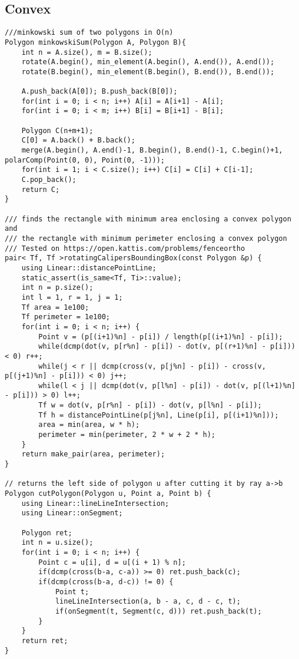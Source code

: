 \documentclass[FSZ,a4paper,onesided]{article}
\begin{document}
\begin{multicols*}{\COLS}
\subsection{Convex}
\begin{lstlisting}
///minkowski sum of two polygons in O(n)
Polygon minkowskiSum(Polygon A, Polygon B){
    int n = A.size(), m = B.size();
    rotate(A.begin(), min_element(A.begin(), A.end()), A.end());
    rotate(B.begin(), min_element(B.begin(), B.end()), B.end());

    A.push_back(A[0]); B.push_back(B[0]);
    for(int i = 0; i < n; i++) A[i] = A[i+1] - A[i];
    for(int i = 0; i < m; i++) B[i] = B[i+1] - B[i];

    Polygon C(n+m+1);
    C[0] = A.back() + B.back();
    merge(A.begin(), A.end()-1, B.begin(), B.end()-1, C.begin()+1, polarComp(Point(0, 0), Point(0, -1)));
    for(int i = 1; i < C.size(); i++) C[i] = C[i] + C[i-1];
    C.pop_back();
    return C;
}

/// finds the rectangle with minimum area enclosing a convex polygon and
/// the rectangle with minimum perimeter enclosing a convex polygon
/// Tested on https://open.kattis.com/problems/fenceortho
pair< Tf, Tf >rotatingCalipersBoundingBox(const Polygon &p) {
    using Linear::distancePointLine;
    static_assert(is_same<Tf, Ti>::value);
    int n = p.size();
    int l = 1, r = 1, j = 1;
    Tf area = 1e100;
    Tf perimeter = 1e100;
    for(int i = 0; i < n; i++) {
        Point v = (p[(i+1)%n] - p[i]) / length(p[(i+1)%n] - p[i]);
        while(dcmp(dot(v, p[r%n] - p[i]) - dot(v, p[(r+1)%n] - p[i])) < 0) r++;
        while(j < r || dcmp(cross(v, p[j%n] - p[i]) - cross(v, p[(j+1)%n] - p[i])) < 0) j++;
        while(l < j || dcmp(dot(v, p[l%n] - p[i]) - dot(v, p[(l+1)%n] - p[i])) > 0) l++;
        Tf w = dot(v, p[r%n] - p[i]) - dot(v, p[l%n] - p[i]);
        Tf h = distancePointLine(p[j%n], Line(p[i], p[(i+1)%n]));
        area = min(area, w * h);
        perimeter = min(perimeter, 2 * w + 2 * h);
    }
    return make_pair(area, perimeter);
}

// returns the left side of polygon u after cutting it by ray a->b
Polygon cutPolygon(Polygon u, Point a, Point b) {
    using Linear::lineLineIntersection;
    using Linear::onSegment;

    Polygon ret;
    int n = u.size();
    for(int i = 0; i < n; i++) {
        Point c = u[i], d = u[(i + 1) % n];
        if(dcmp(cross(b-a, c-a)) >= 0) ret.push_back(c);
        if(dcmp(cross(b-a, d-c)) != 0) {
            Point t;
            lineLineIntersection(a, b - a, c, d - c, t);
            if(onSegment(t, Segment(c, d))) ret.push_back(t);
        }
    }
    return ret;
}


\end{lstlisting}
\end{multicols*}
\end{document}
